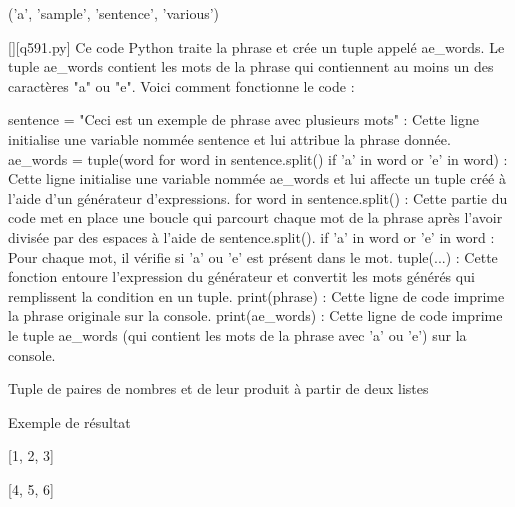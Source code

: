 ('a', 'sample', 'sentence', 'various')
        \par
        \begin{solution}
            \renewcommand{\nomfichier}{q591.py}
            \pythonfile{\chemincode \nomfichier}[][\nomfichier]
            Ce code Python traite la phrase et crée un tuple appelé ae\_words. Le tuple ae\_words contient les mots de la phrase qui contiennent au moins un des caractères "a" ou "e". Voici comment fonctionne le code :

    sentence = "Ceci est un exemple de phrase avec plusieurs mots" : Cette ligne initialise une variable nommée sentence et lui attribue la phrase donnée.
    ae\_words = tuple(word for word in sentence.split() if 'a' in word or 'e' in word) : Cette ligne initialise une variable nommée ae\_words et lui affecte un tuple créé à l'aide d'un générateur d'expressions.
        for word in sentence.split() : Cette partie du code met en place une boucle qui parcourt chaque mot de la phrase après l'avoir divisée par des espaces à l'aide de sentence.split().
        if 'a' in word or 'e' in word : Pour chaque mot, il vérifie si 'a' ou 'e' est présent dans le mot.
        tuple(...) : Cette fonction entoure l'expression du générateur et convertit les mots générés qui remplissent la condition en un tuple.
    print(phrase) : Cette ligne de code imprime la phrase originale sur la console.
    print(ae\_words) : Cette ligne de code imprime le tuple ae\_words (qui contient les mots de la phrase avec 'a' ou 'e') sur la console.
        \end{solution}
        

        \question
        Tuple de paires de nombres et de leur produit à partir de deux listes

Exemple de résultat

[1, 2, 3]

[4, 5, 6]

